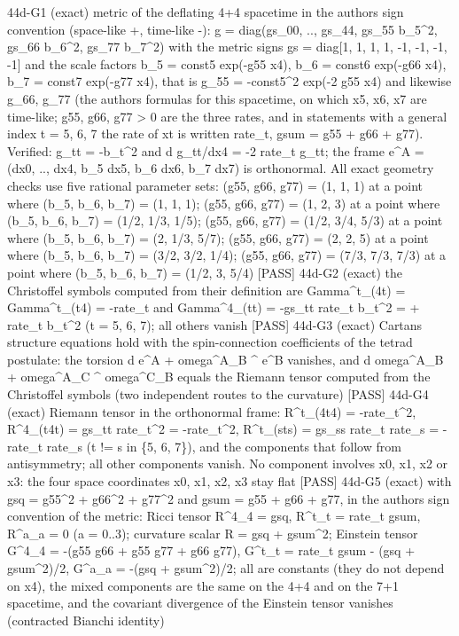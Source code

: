 \documentclass[
  10pt,
]{article}
\newenvironment{Shaded}{}{}
\newcommand{\NormalTok}[1]{#1}
\begin{document}
\begin{Shaded}
\begin{Highlighting}[]
\NormalTok{[PASS] 44d{-}G1  (exact) metric of the deflating 4+4 spacetime in the author\textquotesingle{}s sign convention (space{-}like +, time{-}like {-}): g = diag(gs\_00, .., gs\_44, gs\_55 b\_5\^{}2, gs\_66 b\_6\^{}2, gs\_77 b\_7\^{}2) with the metric signs gs = diag[1, 1, 1, 1, {-}1, {-}1, {-}1, {-}1] and the scale factors b\_5 = const5 exp({-}g55 x4), b\_6 = const6 exp({-}g66 x4), b\_7 = const7 exp({-}g77 x4), that is g\_55 = {-}const5\^{}2 exp({-}2 g55 x4) and likewise g\_66, g\_77 (the author\textquotesingle{}s formulas for this spacetime, on which x5, x6, x7 are time{-}like; g55, g66, g77 \textgreater{} 0 are the three rates, and in statements with a general index t = 5, 6, 7 the rate of xt is written rate\_t, gsum = g55 + g66 + g77). Verified: g\_tt = {-}b\_t\^{}2 and d g\_tt/dx4 = {-}2 rate\_t g\_tt; the frame e\^{}A = (dx0, .., dx4, b\_5 dx5, b\_6 dx6, b\_7 dx7) is orthonormal. All exact geometry checks use five rational parameter sets: (g55, g66, g77) = (1, 1, 1) at a point where (b\_5, b\_6, b\_7) = (1, 1, 1); (g55, g66, g77) = (1, 2, 3) at a point where (b\_5, b\_6, b\_7) = (1/2, 1/3, 1/5); (g55, g66, g77) = (1/2, 3/4, 5/3) at a point where (b\_5, b\_6, b\_7) = (2, 1/3, 5/7); (g55, g66, g77) = (2, 2, 5) at a point where (b\_5, b\_6, b\_7) = (3/2, 3/2, 1/4); (g55, g66, g77) = (7/3, 7/3, 7/3) at a point where (b\_5, b\_6, b\_7) = (1/2, 3, 5/4)}
\NormalTok{[PASS] 44d{-}G2  (exact) the Christoffel symbols computed from their definition are Gamma\^{}t\_(4t) = Gamma\^{}t\_(t4) = {-}rate\_t and Gamma\^{}4\_(tt) = {-}gs\_tt rate\_t b\_t\^{}2 = + rate\_t b\_t\^{}2 (t = 5, 6, 7); all others vanish}
\NormalTok{[PASS] 44d{-}G3  (exact) Cartan\textquotesingle{}s structure equations hold with the spin{-}connection coefficients of the tetrad postulate: the torsion d e\^{}A + omega\^{}A\_B \^{} e\^{}B vanishes, and d omega\^{}A\_B + omega\^{}A\_C \^{} omega\^{}C\_B equals the Riemann tensor computed from the Christoffel symbols (two independent routes to the curvature)}
\NormalTok{[PASS] 44d{-}G4  (exact) Riemann tensor in the orthonormal frame: R\^{}t\_(4t4) = {-}rate\_t\^{}2, R\^{}4\_(t4t) = gs\_tt rate\_t\^{}2 = {-}rate\_t\^{}2, R\^{}t\_(sts) = gs\_ss rate\_t rate\_s = {-}rate\_t rate\_s (t != s in \{5, 6, 7\}), and the components that follow from antisymmetry; all other components vanish. No component involves x0, x1, x2 or x3: the four space coordinates x0, x1, x2, x3 stay flat}
\NormalTok{[PASS] 44d{-}G5  (exact) with gsq = g55\^{}2 + g66\^{}2 + g77\^{}2 and gsum = g55 + g66 + g77, in the author\textquotesingle{}s sign convention of the metric: Ricci tensor R\^{}4\_4 = gsq, R\^{}t\_t = rate\_t gsum, R\^{}a\_a = 0 (a = 0..3); curvature scalar R = gsq + gsum\^{}2; Einstein tensor G\^{}4\_4 = {-}(g55 g66 + g55 g77 + g66 g77), G\^{}t\_t = rate\_t gsum {-} (gsq + gsum\^{}2)/2, G\^{}a\_a = {-}(gsq + gsum\^{}2)/2; all are constants (they do not depend on x4), the mixed components are the same on the 4+4 and on the 7+1 spacetime, and the covariant divergence of the Einstein tensor vanishes (contracted Bianchi identity)}

\end{Highlighting}
\end{Shaded}
\end{document}
